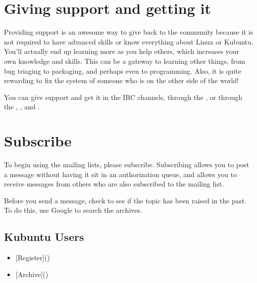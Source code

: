 \documentclass[letterpaper,10pt,english]{sphinxmanual}
\begin{document}
\section{Giving support and getting it}
\label{\detokenize{docs/contribute:giving-support-and-getting-it}}
\sphinxAtStartPar
Providing support is an awesome way to give back to the community because it is not required to have advanced skills or know everything about Linux or Kubuntu. You’ll actually end up learning more as you help others, which increases your own knowledge and skills. This can be a gateway to learning other things, from bug triaging to packaging, and perhaps even to programming. Also, it is quite rewarding to fix the system of someone who is on the other side of the world!

\sphinxAtStartPar
You can give support and get it in the IRC channels, through the , or through the , , and .


\section{Subscribe}
\label{\detokenize{docs/contribute:subscribe}}
\sphinxAtStartPar
To begin using the mailing lists, please subscribe. Subscribing allows you to post a message without having it sit in an authorization queue, and allows you to receive messages from others who are also subscribed to the mailing list.

\sphinxAtStartPar
Before you send a message, check to see if the topic has been raised in the past. To do this, use Google to search the archives.


\subsection{Kubuntu Users}
\label{\detokenize{docs/contribute:kubuntu-users}}\begin{itemize}
\item {} 
\sphinxAtStartPar
{[}Register{]}()

\item {} 
\sphinxAtStartPar
{[}Archive{]}()

\end{itemize}
\end{document}
